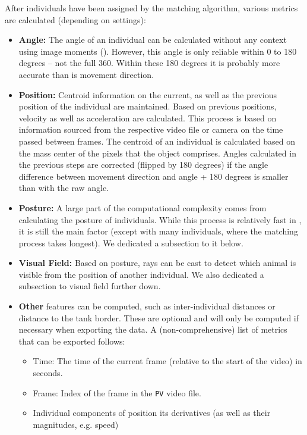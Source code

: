 \documentclass[9pt,lineno]{elife}
\newcommand{\TRex}{\protect\path{TRex}}
\begin{document}
\begin{appendixbox}
After individuals have been assigned by the matching algorithm, various metrics are calculated (depending on settings):

\begin{itemize}
    \item \textbf{Angle:} The angle of an individual can be calculated without any context using image moments (\cite{hu1962visual}). However, this angle is only reliable within 0 to 180 degrees -- not the full 360. Within these 180 degrees it is probably more accurate than is movement direction.
    \item \textbf{Position:} Centroid information on the current, as well as the previous position of the individual are maintained. Based on previous positions, velocity as well as acceleration are calculated. This process is based on information sourced from the respective video file or camera on the time passed between frames. The centroid of an individual is calculated based on the mass center of the pixels that the object comprises. Angles calculated in the previous steps are corrected (flipped by 180 degrees) if the angle difference between movement direction and angle + 180 degrees is smaller than with the raw angle. \item \textbf{Posture:} A large part of the computational complexity comes from calculating the posture of individuals. While this process is relatively fast in \TRex{}, it is still the main factor (except with many individuals, where the matching process takes longest). We dedicated a subsection to it below.
    \item \textbf{Visual Field:} Based on posture, rays can be cast to detect which animal is visible from the position of another individual. We also dedicated a subsection to visual field further down.
    \item \textbf{Other} features can be computed, such as inter-individual distances or distance to the tank border. These are optional and will only be computed if necessary when exporting the data. A (non-comprehensive) list of metrics that can be exported follows:
        \begin{itemize}
            \item Time: The time of the current frame (relative to the start of the video) in seconds.
            \item Frame: Index of the frame in the \texttt{PV} video file.
            \item Individual components of position its derivatives (as well as their magnitudes, e.g. speed)

\end{itemize}
\end{itemize}
\end{appendixbox}
\end{document}
